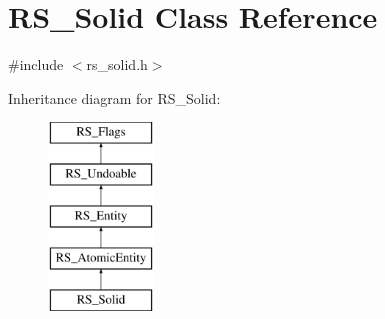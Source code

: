 \hypertarget{classRS__Solid}{\section{R\-S\-\_\-\-Solid Class Reference}
\label{classRS__Solid}
}


{\ttfamily \#include $<$rs\-\_\-solid.\-h$>$}

Inheritance diagram for R\-S\-\_\-\-Solid\-:\begin{figure}[H]
\begin{center}
\leavevmode
\includegraphics[height=5.000000cm]{classRS__Solid}
\end{center}
\end{figure}
